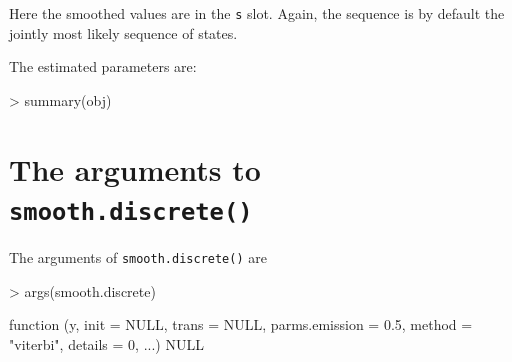 \documentclass{article}
\begin{document}
Here the smoothed values are in the \verb's' slot.
Again, the sequence is by default the jointly most likely
sequence of states. 


The estimated parameters are:
\begin{Schunk}
\begin{Sinput}
> summary(obj)
\end{Sinput}
\end{Schunk}


\section{The arguments to \texttt{smooth.discrete()}}
\label{sec:xxx}



The arguments of \verb'smooth.discrete()' are
\begin{Schunk}
\begin{Sinput}
> args(smooth.discrete)
\end{Sinput}
\begin{Soutput}
function (y, init = NULL, trans = NULL, parms.emission = 0.5, 
    method = "viterbi", details = 0, ...) 
NULL
\end{Soutput}
\end{Schunk}
\end{document}

